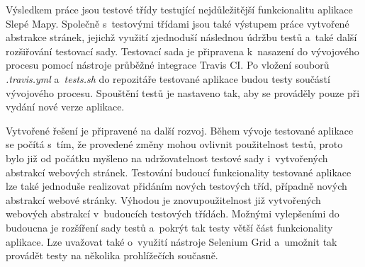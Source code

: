 \documentclass[
    color,   %
	table,   %
    twoside, %
    nolot, nolof,
]{fithesis3}
\begin{document}
Výsledkem práce jsou testové třídy testující nejdůležitější funkcionalitu aplikace Slepé Mapy. Společně s~testovými třídami jsou také výstupem práce vytvořené abstrakce stránek, jejichž využití zjednoduší následnou údržbu testů a~také další rozšiřování testovací sady. Testovací sada je připravena k~nasazení do vývojového procesu pomocí nástroje průběžné integrace Travis CI. Po vložení souborů \emph{.travis.yml} a~\emph{tests.sh} do repozitáře testované aplikace budou testy součástí vývojového procesu. Spouštění testů je nastaveno tak, aby se prováděly pouze při vydání nové verze aplikace.

Vytvořené řešení je připravené na další rozvoj. Během vývoje testované aplikace se počítá s~tím, že provedené změny mohou ovlivnit použitelnost testů, proto bylo již od počátku myšleno na udržovatelnost testové sady i~vytvořených abstrakcí webových stránek. Testování budoucí funkcionality testované aplikace lze také jednoduše realizovat přidáním nových testových tříd, případně nových abstrakcí webové stránky. Výhodou je znovupoužitelnost již vytvořených webových abstrakcí v~budoucích testových třídách. Možnými vylepšeními do budoucna je rozšíření sady testů a~pokrýt tak testy větší část funkcionality aplikace. Lze uvažovat také o~využití nástroje Selenium Grid a~umožnit tak provádět testy na několika prohlížečích současně.
\end{document}
